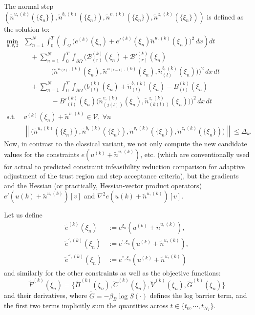 \documentclass{article}
\newcommand{\1}{\mathds{1}}          %
\theoremstyle{definition}
\begin{document}
\begin{sloppypar}
The normal step $(\tilde{n}^{u,(k)}(\{\xi_n\}),\tilde{n}^{b,(k)}(\{\xi_n\}),\tilde{n}^{v,(k)}(\{\xi_n\}),\tilde{n}^{z,(k)}(\{\xi_n\}))$ is defined as the solution to:
\begin{equation}\label{eq:subptrnormal}
\begin{array}{rl}
\min\limits_{u,v,z} 
& \sum\limits_{n=1}^N\int_{0}^{T}
\left(
\int_{\Omega}
\big(e^{(k)}(\xi_n)
+e'^{(k)}(\xi_n)\tilde{n}^{u,(k)}(\xi_n)\big)^2
\,dx
\right)dt
\\
&\quad
+\sum\limits_{n=1}^N\int_{0}^{T}\int_{\partial\Omega}
\Big(
\mathcal{B}^{(k)}_{(r)}(\xi_n)
+\mathcal{B}'^{(k)}_{(r)}(\xi_n)
\\
&\qquad\qquad
\big(\tilde{n}^{u_{(r)},(k)}(\xi_n),
\tilde{n}^{u_{(r-1)},(k)}(\xi_n),
\tilde{n}_{(l)}^{b,(k)}(\xi_n)\big)
\Big)^2
\,dx\,dt
\\
&\quad
+\sum\limits_{n=1}^N\int_{0}^{T}\int_{\partial\Omega}
\Big(
b^{(k)}_{(l)}(\xi_n)
+\tilde{n}^{b,(k)}_{(l)}(\xi_n)
-B^{(k)}_{(l)}(\xi_n)
\\
&\qquad\qquad
-B'^{(k)}_{(l)}(\xi_n)
\big(
\tilde{n}^{v,(k)}_{(j(l))}(\xi_n),
\tilde{n}^{z,(k)}_{(k(l))}(\xi_n)
\big)
\Big)^2
\,dx\,dt
\\[0.5em]
\text{s.t. } 
& v^{(k)}(\xi_n)+\tilde{n}^{v,(k)}\in\mathcal{V},
\ \forall n
\\
& \left\|
\big(
\tilde{n}^{u,(k)}(\{\xi_n\}),
\tilde{n}^{b,(k)}(\{\xi_n\}),
\tilde{n}^{v,(k)}(\{\xi_n\}),
\tilde{n}^{z,(k)}(\{\xi_n\})
\big)
\right\|
\le \Delta_k.
\end{array}
\end{equation}
Now, in contrast to the classical variant, we not only compute the new candidate values for the constraints $e(u^{(k)}+\tilde{n}^{u,(k)})$, etc. (which are conventionally used for actual to predicted constraint infeasibility reduction comparison for adaptive adjustment of the trust region and step acceptance criteria), but the gradients and the Hessian (or practically, Hessian-vector product operators) $e'(u(k)+\tilde{n}^{u,(k)})[v]$ and $\nabla^2 e(u(k)+\tilde{n}^{u,(k)})[v]$.

Let us define
\begin{align*}
\tilde{e}^{(k)}(\xi_n) &:= e^{\xi_n}(u^{(k)}+\tilde{n}^{u,(k)}), \\ 
\tilde{e}^{',(k)}(\xi_n) &:= e^{',\xi_n}(u^{(k)}+\tilde{n}^{u,(k)}), \\
\tilde{e}^{'',(k)}(\xi_n) &:= e^{'',\xi_n}(u^{(k)}+\tilde{n}^{u,(k)})
\end{align*}
and similarly for the other constraints as well as the objective functions:
\[
\tilde{F}^{(k)}(\xi_n)=\{\tilde{\Pi}^{(k)}(\xi_n),\tilde{C}^{(k)}(\xi_n),\tilde{V}^{(k)}(\xi_n),\tilde{G}^{(k)}(\xi_n)\}
\]
and their derivatives, where $\tilde{G}=-\beta_B\log S(\cdot)$ defines the log barrier term, and the first two terms implicitly sum the quantities across $t\in\{t_0,\cdots, t_{N_T}\}$.


\end{sloppypar}
\end{document}
